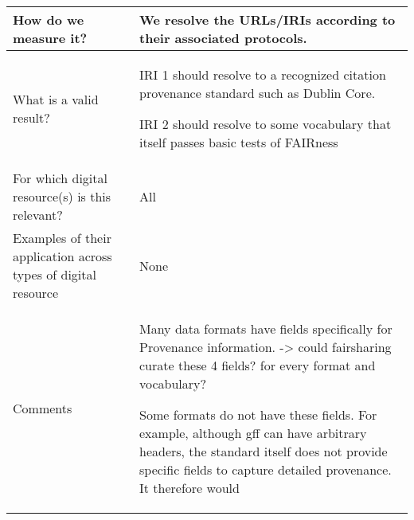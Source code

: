 \documentclass[english]{article}
\begin{document}
\begin{longtable}{|p{5cm}|p{9cm}|}
\\



\hline
How do we measure it? &  


We resolve the URLs/IRIs according to their associated protocols. 


\\



\hline
What is a valid result? &  


IRI 1 should resolve to a recognized citation provenance standard such as Dublin Core.\newline 

IRI 2 should resolve to some vocabulary that itself passes basic tests of FAIRness\newline


\\



\hline
For which digital resource(s) is this relevant? &  All\\



\hline
Examples of their application across types of digital resource &  None

\\



\hline

Comments & 


Many data formats have fields specifically for Provenance information.  -> could fairsharing curate these 4 fields? for every format and vocabulary? \newline

Some formats do not have these fields.  For example, although gff can have arbitrary headers, the standard itself does not provide specific fields to capture detailed provenance. It therefore would 




\\
\hline

\end{longtable}




\newpage
\end{document}
